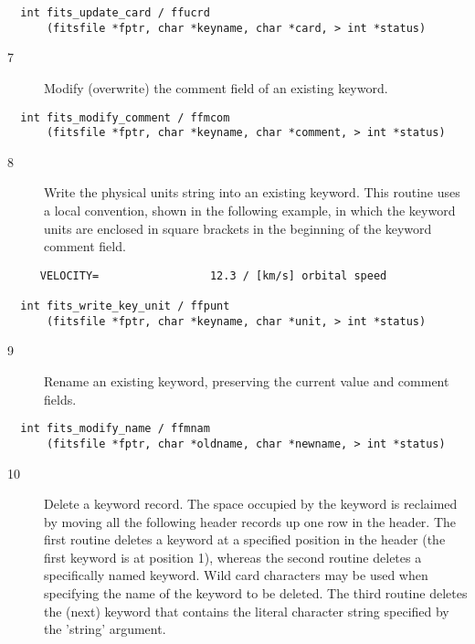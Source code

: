 \documentclass[11pt]{book}
\begin{document}
\begin{verbatim}
  int fits_update_card / ffucrd
      (fitsfile *fptr, char *keyname, char *card, > int *status)
\end{verbatim}


\begin{description}
\item[7 ] Modify (overwrite) the comment field of an existing keyword. \label{ffmcom}
\end{description}

\begin{verbatim}
  int fits_modify_comment / ffmcom
      (fitsfile *fptr, char *keyname, char *comment, > int *status)
\end{verbatim}


\begin{description}
\item[8 ] Write the physical units string into an existing keyword.  This
    routine uses a local convention, shown in the following example,
    in which the keyword units are enclosed in square brackets in the
   beginning of the keyword comment field.  \label{ffpunt}
\end{description}

\begin{verbatim}
     VELOCITY=                 12.3 / [km/s] orbital speed

  int fits_write_key_unit / ffpunt
      (fitsfile *fptr, char *keyname, char *unit, > int *status)
\end{verbatim}

\begin{description}
\item[9 ] Rename an existing keyword, preserving the current value
   and comment fields. \label{ffmnam}
\end{description}

\begin{verbatim}
  int fits_modify_name / ffmnam
      (fitsfile *fptr, char *oldname, char *newname, > int *status)
\end{verbatim}

\begin{description}
\item[10]  Delete a keyword record.  The space occupied by
    the keyword is reclaimed by moving all the following header records up
    one row in the header.  The first routine deletes a keyword at a
    specified position in the header (the first keyword is at position 1),
    whereas the second routine deletes a specifically named keyword.
    Wild card characters may be used when specifying the name of the keyword
    to be deleted. The third routine deletes the (next) keyword that contains
    the literal character string specified by the 'string'
   argument.\label{ffdrec} \label{ffdkey}
\end{description}
\end{document}
